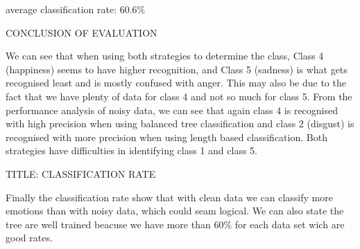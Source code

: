 average classification rate:
60.6\%


CONCLUSION OF EVALUATION

We can see that when using both strategies to determine the class, Class 4 (happiness) seems to have higher recognition, and Class 5 (sadness) is what gets recognised least and is mostly confused with anger. This may also be due to the fact that we have plenty of data for class 4 and not so much for class 5.
From the performance analysis of noisy data, we can see that again class 4 is recognised with high precision when using balanced tree classification and class 2 (disgust) is recognised with more precision when using length based classification. Both strategies have difficulties in identifying class 1 and class 5.

TITLE: CLASSIFICATION RATE

Finally the classification rate show that with clean data we can classify more emotions than with noisy data, which could seam logical. 
We can also state the tree are well trained beacuse we have more than 60\% for each data set wich are good rates. 




